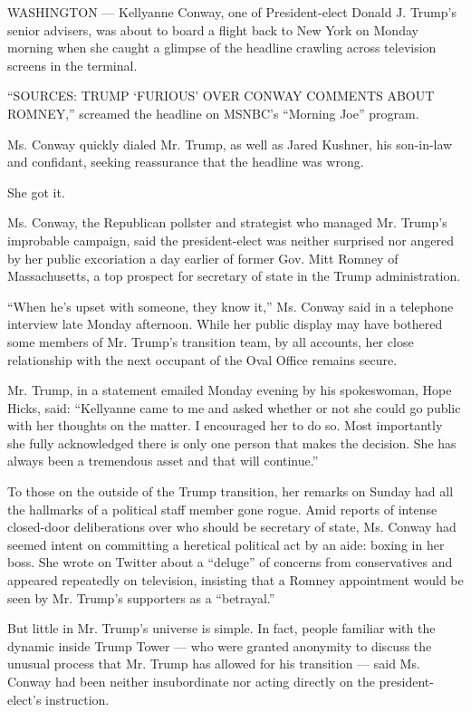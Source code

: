 WASHINGTON --- Kellyanne Conway, one of President-elect Donald J.
Trump's senior advisers, was about to board a flight back to New York on
Monday morning when she caught a glimpse of the headline crawling across
television screens in the terminal.

``SOURCES: TRUMP `FURIOUS' OVER CONWAY COMMENTS ABOUT ROMNEY,'' screamed
the headline on MSNBC's ``Morning Joe'' program.

Ms. Conway quickly dialed Mr. Trump, as well as Jared Kushner, his
son-in-law and confidant, seeking reassurance that the headline was
wrong.

She got it.

Ms. Conway, the Republican pollster and strategist who managed Mr.
Trump's improbable campaign, said the president-elect was neither
surprised nor angered by her public excoriation a day earlier of former
Gov. Mitt Romney of Massachusetts, a top prospect for secretary of state
in the Trump administration.

``When he's upset with someone, they know it,'' Ms. Conway said in a
telephone interview late Monday afternoon. While her public display may
have bothered some members of Mr. Trump's transition team, by all
accounts, her close relationship with the next occupant of the Oval
Office remains secure.

Mr. Trump, in a statement emailed Monday evening by his spokeswoman,
Hope Hicks, said: ``Kellyanne came to me and asked whether or not she
could go public with her thoughts on the matter. I encouraged her to do
so. Most importantly she fully acknowledged there is only one person
that makes the decision. She has always been a tremendous asset and that
will continue.''

To those on the outside of the Trump transition, her remarks on Sunday
had all the hallmarks of a political staff member gone rogue. Amid
reports of intense closed-door deliberations over who should be
secretary of state, Ms. Conway had seemed intent on committing a
heretical political act by an aide: boxing in her boss. She wrote on
Twitter about a ``deluge'' of concerns from conservatives and appeared
repeatedly on television, insisting that a Romney appointment would be
seen by Mr. Trump's supporters as a ``betrayal.''

But little in Mr. Trump's universe is simple. In fact, people familiar
with the dynamic inside Trump Tower --- who were granted anonymity to
discuss the unusual process that Mr. Trump has allowed for his
transition --- said Ms. Conway had been neither insubordinate nor acting
directly on the president-elect's instruction.

